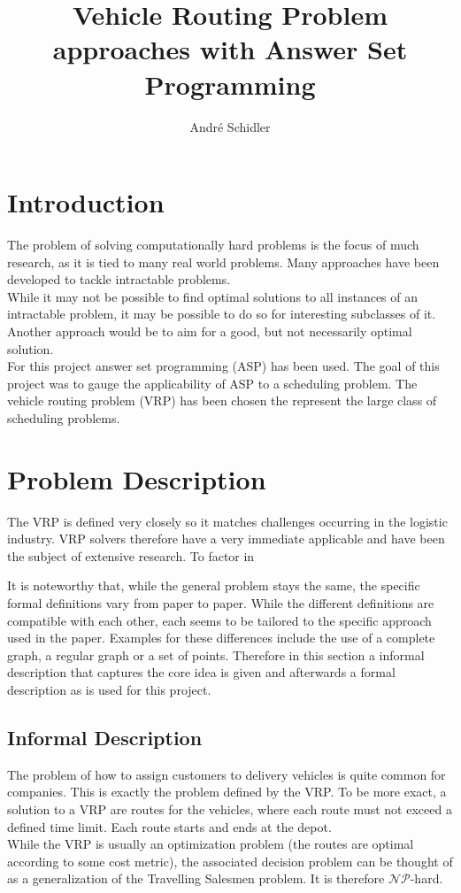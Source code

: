 \documentclass[12pt, letterpaper]{article}
\title{Vehicle Routing Problem approaches with Answer Set Programming}
\author{André Schidler}
\begin{document}
\maketitle

\section{Introduction}
The problem of solving computationally hard problems is the focus of much research, as it is tied to many real world problems. Many approaches have been developed to tackle intractable problems.\\
While it may not be possible to find optimal solutions to all instances of an intractable problem, it may be possible to do so for interesting subclasses of it. Another approach would be to aim for a good, but not necessarily optimal solution.\\

For this project answer set programming (ASP) has been used. The goal of this project was to gauge the applicability of ASP to a scheduling problem. The vehicle routing problem (VRP) has been chosen the represent the large class of scheduling problems.\\


\section{Problem Description}
The VRP is defined very closely so it matches challenges occurring in the logistic industry. VRP solvers therefore have a very immediate applicable and have been the subject of extensive research. To factor in 

It is noteworthy that, while the general problem stays the same, the specific formal definitions vary from paper to paper. While the different definitions are compatible with each other, each seems to be tailored to the specific approach used in the paper. Examples for these differences include the use of a complete graph, a regular graph or a set of points.
Therefore in this section a informal description that captures the core idea is given and afterwards a formal description as is used for this project.

\subsection{Informal Description}
The problem of how to assign customers to delivery vehicles is quite common for companies. This is exactly the problem defined by the VRP. To be more exact, a solution to a VRP are routes for the vehicles, where each route must not exceed a defined time limit. Each route starts and ends at the depot.\\
While the VRP is usually an optimization problem (the routes are optimal according to some cost metric), the associated decision problem can be thought of as a generalization of the Travelling Salesmen problem. It is therefore $\mathcal{NP}$-hard.\\
\end{document}
